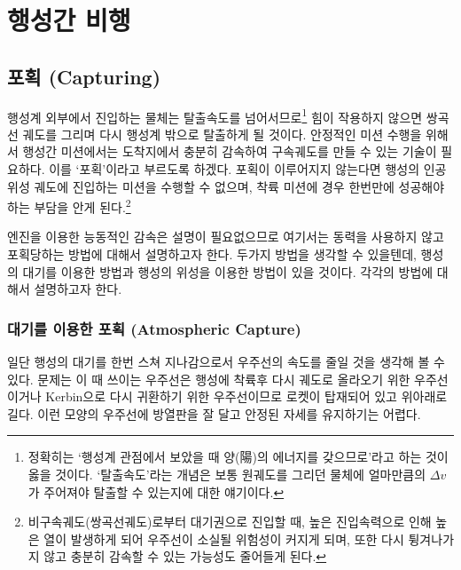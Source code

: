 \documentclass[9pt,twoside,openany]{amsbook}
\begin{document}



\part{행성간 비행}
\chapter{포획 (Capturing)}
행성계 외부에서 진입하는 물체는 탈출속도를 넘어서므로\footnote{정확히는 `행성계 관점에서 보았을 때 양(陽)의 에너지를 갖으므로'라고 하는 것이 옳을 것이다. `탈출속도'라는 개념은 보통 원궤도를 그리던 물체에 얼마만큼의 $\Delta v$가 주어져야 탈출할 수 있는지에 대한 얘기이다.} 힘이 작용하지 않으면 쌍곡선 궤도를 그리며 다시 행성계 밖으로 탈출하게 될 것이다.
안정적인 미션 수행을 위해서 행성간 미션에서는 도착지에서 충분히 감속하여 구속궤도를 만들 수 있는 기술이 필요하다. 이를 `포획'이라고 부르도록 하겠다. 포획이 이루어지지 않는다면 행성의 인공위성 궤도에 진입하는 미션을 수행할 수 없으며, 착륙 미션에 경우 한번만에 성공해야 하는 부담을 안게 된다.\footnote{비구속궤도(쌍곡선궤도)로부터 대기권으로 진입할 때, 높은 진입속력으로 인해 높은 열이 발생하게 되어 우주선이 소실될 위험성이 커지게 되며, 또한 다시 튕겨나가지 않고 충분히 감속할 수 있는 가능성도 줄어들게 된다.}

엔진을 이용한 능동적인 감속은 설명이 필요없으므로 여기서는 동력을 사용하지 않고 포획당하는 방법에 대해서 설명하고자 한다. 두가지 방법을 생각할 수 있을텐데, 행성의 대기를 이용한 방법과 행성의 위성을 이용한 방법이 있을 것이다. 각각의 방법에 대해서 설명하고자 한다.
\section{대기를 이용한 포획 (Atmospheric Capture)}
일단 행성의 대기를 한번 스쳐 지나감으로서 우주선의 속도를 줄일 것을 생각해 볼 수 있다. 문제는 이 때 쓰이는 우주선은 행성에 착륙후 다시 궤도로 올라오기 위한 우주선이거나 Kerbin으로 다시 귀환하기 위한 우주선이므로 로켓이 탑재되어 있고 위아래로 길다. 이런 모양의 우주선에 방열판을 잘 달고 안정된 자세를 유지하기는 어렵다.
\end{document}
